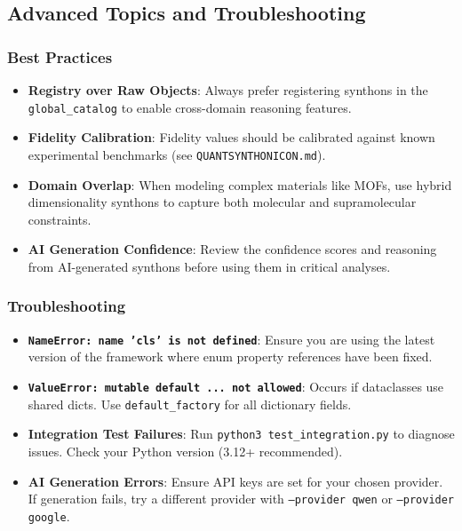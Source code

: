 \documentclass[12pt,a4paper]{article}
\begin{document}
\subsection{Advanced Topics and Troubleshooting}

\subsubsection{Best Practices}

\begin{itemize}
    \item \textbf{Registry over Raw Objects}: Always prefer registering synthons in the \texttt{global\_catalog} to enable cross-domain reasoning features.
    \item \textbf{Fidelity Calibration}: Fidelity values should be calibrated against known experimental benchmarks (see \texttt{QUANTSYNTHONICON.md}).
    \item \textbf{Domain Overlap}: When modeling complex materials like MOFs, use hybrid dimensionality synthons to capture both molecular and supramolecular constraints.
    \item \textbf{AI Generation Confidence}: Review the confidence scores and reasoning from AI-generated synthons before using them in critical analyses.
\end{itemize}

\subsubsection{Troubleshooting}

\begin{itemize}
    \item \textbf{\texttt{NameError: name 'cls' is not defined}}: Ensure you are using the latest version of the framework where enum property references have been fixed.
    \item \textbf{\texttt{ValueError: mutable default ... not allowed}}: Occurs if dataclasses use shared dicts. Use \texttt{default\_factory} for all dictionary fields.
    \item \textbf{Integration Test Failures}: Run \texttt{python3 test\_integration.py} to diagnose issues. Check your Python version (3.12+ recommended).
    \item \textbf{AI Generation Errors}: Ensure API keys are set for your chosen provider. If generation fails, try a different provider with \texttt{--provider qwen} or \texttt{--provider google}.
\end{itemize}
\end{document}
